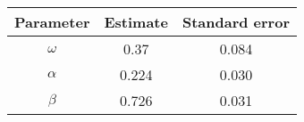 \begin{tabular}{ccc}
  \toprule
  \textbf{Parameter} & \textbf{Estimate} & \textbf{Standard error} \\\midrule
  \(\omega\) & 0.37 & 0.084 \\
  \(\alpha\) & 0.224 & 0.030 \\
  \(\beta\) & 0.726 & 0.031 \\\bottomrule
\end{tabular}

